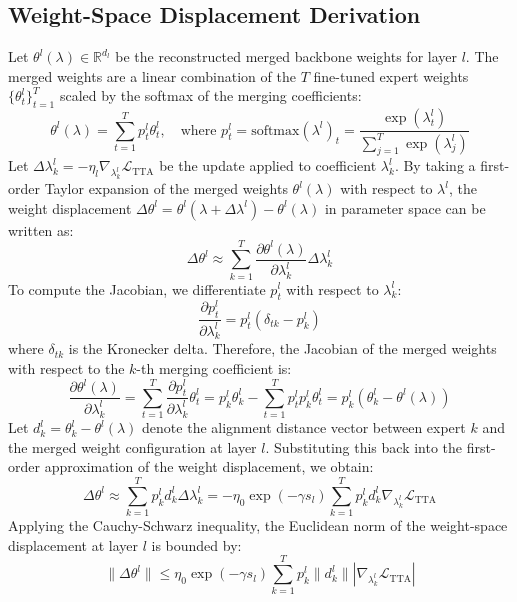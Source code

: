 \documentclass{article}
\begin{document}
\subsection{Weight-Space Displacement Derivation}
Let $\theta^l(\lambda) \in \mathbb{R}^{d_l}$ be the reconstructed merged backbone weights for layer $l$. The merged weights are a linear combination of the $T$ fine-tuned expert weights $\{\theta_t^l\}_{t=1}^T$ scaled by the softmax of the merging coefficients:
\begin{equation}
    \theta^l(\lambda) = \sum_{t=1}^T p_t^l \theta_t^l, \quad \text{where } p_t^l = \text{softmax}(\lambda^l)_t = \frac{\exp(\lambda^l_t)}{\sum_{j=1}^T \exp(\lambda^l_j)}
\end{equation}
Let $\Delta \lambda^l_k = -\eta_l \nabla_{\lambda^l_k} \mathcal{L}_{\text{TTA}}$ be the update applied to coefficient $\lambda^l_k$. By taking a first-order Taylor expansion of the merged weights $\theta^l(\lambda)$ with respect to $\lambda^l$, the weight displacement $\Delta \theta^l = \theta^l(\lambda + \Delta \lambda^l) - \theta^l(\lambda)$ in parameter space can be written as:
\begin{equation}
    \Delta \theta^l \approx \sum_{k=1}^T \frac{\partial \theta^l(\lambda)}{\partial \lambda^l_k} \Delta \lambda^l_k
\end{equation}
To compute the Jacobian, we differentiate $p_t^l$ with respect to $\lambda^l_k$:
\begin{equation}
    \frac{\partial p_t^l}{\partial \lambda^l_k} = p_t^l (\delta_{tk} - p_k^l)
\end{equation}
where $\delta_{tk}$ is the Kronecker delta. Therefore, the Jacobian of the merged weights with respect to the $k$-th merging coefficient is:
\begin{equation}
    \frac{\partial \theta^l(\lambda)}{\partial \lambda^l_k} = \sum_{t=1}^T \frac{\partial p_t^l}{\partial \lambda^l_k} \theta_t^l = p_k^l \theta_k^l - \sum_{t=1}^T p_t^l p_k^l \theta_t^l = p_k^l \left( \theta_k^l - \theta^l(\lambda) \right)
\end{equation}
Let $d_k^l = \theta_k^l - \theta^l(\lambda)$ denote the alignment distance vector between expert $k$ and the merged weight configuration at layer $l$. Substituting this back into the first-order approximation of the weight displacement, we obtain:
\begin{equation}
    \Delta \theta^l \approx \sum_{k=1}^T p_k^l d_k^l \Delta \lambda^l_k = -\eta_0 \exp(-\gamma s_l) \sum_{k=1}^T p_k^l d_k^l \nabla_{\lambda^l_k} \mathcal{L}_{\text{TTA}}
\end{equation}
Applying the Cauchy-Schwarz inequality, the Euclidean norm of the weight-space displacement at layer $l$ is bounded by:
\begin{equation}
    \|\Delta \theta^l\| \le \eta_0 \exp(-\gamma s_l) \sum_{k=1}^T p_k^l \|d_k^l\| |\nabla_{\lambda^l_k} \mathcal{L}_{\text{TTA}}|
    \label{eq:weight_bound}
\end{equation}
\end{document}
